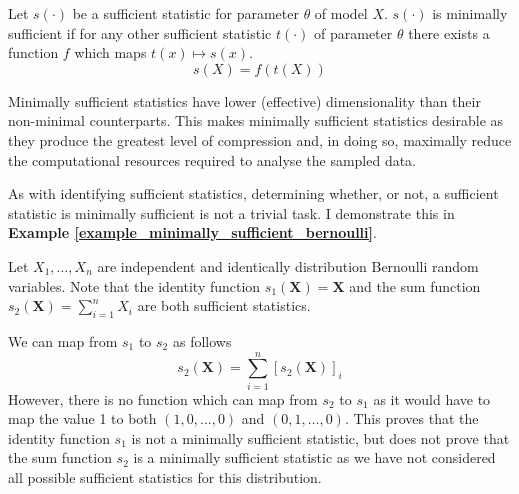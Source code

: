 \documentclass[11pt,a4paper]{article}
\theoremstyle{break}
\begin{document}
  \begin{box_definition}\label{def_minimally_sufficient_statistic}
    Let $s(\cdot)$ be a sufficient statistic for parameter $\theta$ of model $X$. $s(\cdot)$ is minimally sufficient if for any other sufficient statistic $t(\cdot)$ of parameter $\theta$ there exists a function $f$ which maps $t(x)\mapsto s(x)$.
    \[ s(X)=f(t(X)) \]
  \end{box_definition}

  \par Minimally sufficient statistics have lower (effective) dimensionality than their non-minimal counterparts. This makes minimally sufficient statistics desirable as they produce the greatest level of compression and, in doing so, maximally reduce the computational resources required to analyse the sampled data.

  \par As with identifying sufficient statistics, determining whether, or not, a sufficient statistic is minimally sufficient is not a trivial task. I demonstrate this in \textbf{Example \ref{example_minimally_sufficient_bernoulli}}.

  \begin{box_example}\label{example_minimally_sufficient_bernoulli}
    Let $X_1,\dots,X_n$ are independent and identically distribution Bernoulli random variables. Note that the identity function $s_1(\mathbf{X})=\mathbf{X}$ and the sum function $s_2(\mathbf{X})=\sum_{i=1}^nX_i$ are both sufficient statistics.
    \par We can map from $s_1$ to $s_2$ as follows
    \[ s_2(\mathbf{X})=\sum_{i=1}^n [s_2(\mathbf{X})]_i \]
    However, there is no function which can map from $s_2$ to $s_1$ as it would have to map the value 1 to both $(1,0,\dots,0)$ and $(0,1,\dots,0)$. This proves that the identity function $s_1$ is not a minimally sufficient statistic, but does not prove that the sum function $s_2$ is a minimally sufficient statistic as we have not considered all possible sufficient statistics for this distribution.
  \end{box_example}
\end{document}
